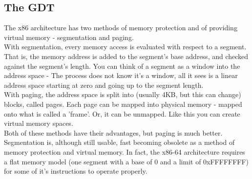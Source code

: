 \documentclass[12pt]{article}
\begin{document}
\subsection{The GDT}
The x86 architecture has two methods of memory protection and of providing virtual memory - segmentation and paging.\\
With segmentation, every memory access is evaluated with respect to a segment. That is, the memory address is added to the segment's base address, and checked against the segment's length. You can think of a segment as a window into the address space - The process does not know it's a window, all it sees is a linear address space starting at zero and going up to the segment length.\\
With paging, the address space is split into (usually 4KB, but this can change) blocks, called pages. Each page can be mapped into physical memory - mapped onto what is called a 'frame'. Or, it can be unmapped. Like this you can create virtual memory spaces.\\
Both of these methods have their advantages, but paging is much better. Segmentation is, although still usable, fast becoming obsolete as a method of memory protection and virtual memory. In fact, the x86-64 architecture requires a flat memory model (one segment with a base of 0 and a limit of 0xFFFFFFFF) for some of it's instructions to operate properly.\\
\end{document}
